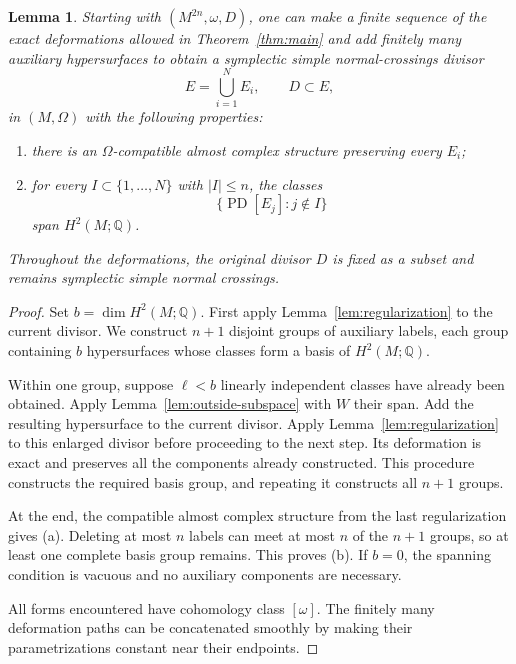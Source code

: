 \documentclass[11pt]{article}
\newtheorem{lemma}[theorem]{Lemma}
\theoremstyle{definition}
\theoremstyle{remark}
\newcommand{\Q}{\mathbb Q}
\newcommand{\PD}{\operatorname{PD}}
\begin{document}
\begin{lemma}\label{lem:redundant-enlargement}
Starting with $(M^{2n},\omega,D)$, one can make a finite sequence
of the exact deformations allowed in Theorem~\ref{thm:main} and
add finitely many auxiliary hypersurfaces to obtain a symplectic
simple normal-crossings divisor
\[
E=\bigcup_{i=1}^{N}E_i,\qquad D\subset E,
\]
in $(M,\Omega)$ with the following properties:
\begin{enumerate}[label=\textup{(\alph*)}]
\item there is an $\Omega$-compatible almost complex structure
      preserving every $E_i$;
\item for every $I\subset\{1,\ldots,N\}$ with $|I|\leq n$,
      the classes
      \[
      \{\PD[E_j]:j\notin I\}
      \]
      span $H^2(M;\Q)$.
\end{enumerate}
Throughout the deformations, the original divisor $D$ is fixed
as a subset and remains symplectic simple normal crossings.
\end{lemma}

\begin{proof}
Set $b=\dim H^2(M;\Q)$.  First apply
Lemma~\ref{lem:regularization} to the current divisor.
We construct $n+1$ disjoint groups of auxiliary labels, each
group containing $b$ hypersurfaces whose classes form a basis
of $H^2(M;\Q)$.

Within one group, suppose $\ell<b$ linearly independent classes
have already been obtained.  Apply
Lemma~\ref{lem:outside-subspace} with $W$ their span.  Add the
resulting hypersurface to the current divisor.  Apply
Lemma~\ref{lem:regularization} to this enlarged divisor before
proceeding to the next step.  Its deformation is exact and
preserves all the components already constructed.  This
procedure constructs the required basis group, and repeating
it constructs all $n+1$ groups.

At the end, the compatible almost complex structure from the
last regularization gives (a).  Deleting at most $n$ labels can
meet at most $n$ of the $n+1$ groups, so at least one complete
basis group remains.  This proves (b).  If $b=0$, the spanning
condition is vacuous and no auxiliary components are necessary.

All forms encountered have cohomology class $[\omega]$.
The finitely many deformation paths can be concatenated
smoothly by making their parametrizations constant near their
endpoints.
\end{proof}
\end{document}
